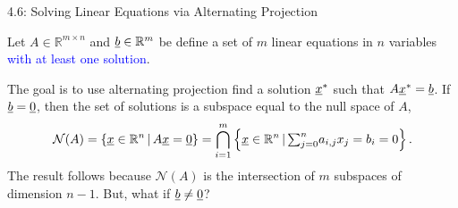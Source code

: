\documentclass[10pt,english,aspectratio=169]{beamer}
\begin{document}
\begin{frame}{4.6: Solving Linear Equations via Alternating Projection}

\vspace{-10mm}

Let $A\in\mathbb{R}^{m\times n}$ and $\underline b\in\mathbb{R}^{m}$ be define a set of $m$ linear equations in $n$ variables \textcolor{blue}{with at least one solution}.

\vspace{3mm}

The goal is to use alternating projection find a solution $\underline x^{*}$ such that $A\underline x^{*}=\underline b$. If $\underline b=\underline 0$, then the set of solutions is a subspace equal to the null space of $A$,
\[
\mathcal{N}(A)=\left\{ \underline x\in\mathbb{R}^{n}\,|\,A\underline x=\underline 0\right\} =\bigcap_{i=1}^{m}\left\{ \underline x\in\mathbb{R}^{n}\,|\,{\textstyle \sum_{j=0}^{n}}a_{i,j}x_{j}=b_i = 0\right\} .
\]
The result follows because $\mathcal{N}(A)$ is the intersection of $m$ subspaces of dimension $n-1$. But, what if $\underline b\neq\underline 0$?


\end{frame}
\end{document}
